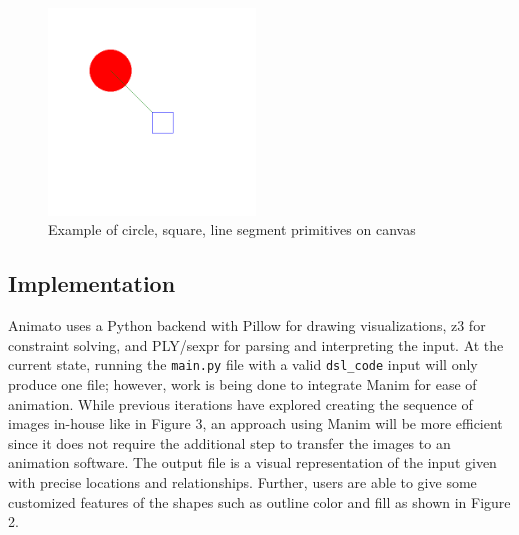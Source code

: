 \documentclass[acmsmall,screen]{acmart}
\begin{document}
\begin{center}
  \begin{figure}[!h]
    \includegraphics[width=0.49\textwidth]{images/primitives.png}
    \caption{Example of circle, square, line segment primitives on canvas}
  \end{figure}
\end{center}

\subsection{Implementation}
Animato uses a Python backend with Pillow for drawing visualizations, z3 for constraint solving, and PLY/sexpr for parsing and interpreting the input.
At the current state, running the \texttt{main.py} file with a valid \texttt{dsl\_code} input will only produce one file; however, work is being done to integrate Manim \cite{manim} for ease of animation.
While previous iterations have explored creating the sequence of images in-house like in Figure 3, an approach using Manim will be more efficient since it does not require the additional step to transfer the images to an animation software.
The output file is a visual representation of the input given with precise locations and relationships.
Further, users are able to give some customized features of the shapes such as outline color and fill as shown in Figure 2.
\end{document}
